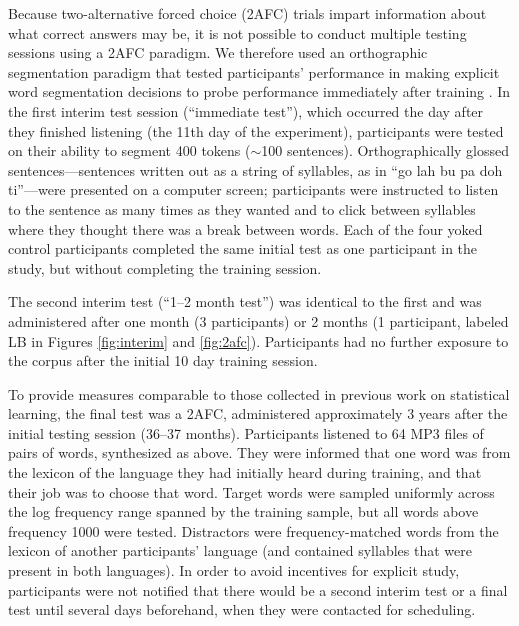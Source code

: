 \documentclass[10pt]{article}
\begin{document}
Because two-alternative forced choice (2AFC) trials impart information about what correct answers may be, it is not possible to conduct multiple testing sessions using a 2AFC paradigm. We therefore used an orthographic segmentation paradigm that tested participants' performance in making explicit word segmentation decisions to probe performance immediately after training \cite{frank2010b,kurumada2011}. 
In the first interim test session (``immediate test''), which occurred the day after they finished listening (the 11th day of the experiment), participants were tested on their ability to segment 400 tokens ($\sim$100 sentences). Orthographically glossed sentences---sentences written out as a string of syllables, as in ``go lah bu pa doh ti''---were presented on a computer screen; participants were instructed to listen to the sentence as many times as they wanted and to click between syllables where they thought there was a break between words. Each of the four yoked control participants completed the same initial test as one participant in the study, but without completing the training session. 

The second interim test (``1--2 month test'') was identical to the first and was administered after one month (3 participants) or 2 months (1 participant, labeled LB in Figures \ref{fig:interim} and \ref{fig:2afc}). Participants had no further exposure to the corpus after the initial 10 day training session. 

To provide measures comparable to those collected in previous work on statistical learning, the final test was a 2AFC, administered approximately 3 years after the initial testing session (36--37 months). Participants listened to 64 MP3 files of pairs of words, synthesized as above. They were informed that one word was from the lexicon of the language they had initially heard during training, and that their job was to choose that word. Target words were sampled uniformly across the log frequency range spanned by the training sample, but all words above frequency 1000 were tested. Distractors were frequency-matched words from the lexicon of another participants' language (and contained syllables that were present in both languages). In order to avoid incentives for explicit study, participants were not notified that there would be a second interim test or a final test until several days beforehand, when they were contacted for scheduling.
\end{document}
